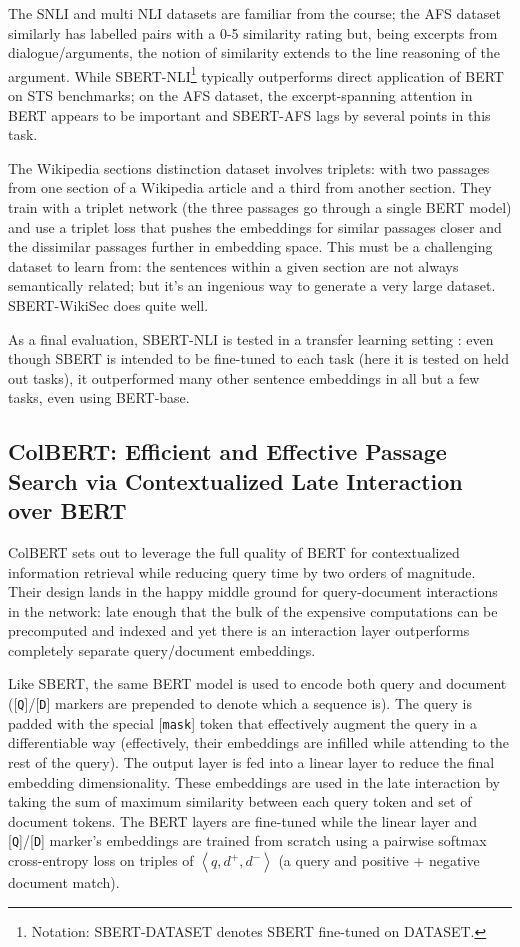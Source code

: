 \documentclass[11pt]{article}
\begin{document}
The SNLI and multi NLI datasets are familiar from the course; the AFS dataset similarly has labelled pairs with a 0-5 similarity rating but, being excerpts from dialogue/arguments, the notion of similarity extends to the line reasoning of the argument. While SBERT-NLI\footnote[1]{Notation: SBERT-DATASET denotes SBERT fine-tuned on DATASET.} typically outperforms direct application of BERT on STS benchmarks; on the AFS dataset, the excerpt-spanning attention in BERT appears to be important and SBERT-AFS lags by several points in this task. 

The Wikipedia sections distinction dataset involves triplets: with two passages from one section of a Wikipedia article and a third from another section. They train with a triplet network (the three passages go through a single BERT model) and use a triplet loss that pushes the embeddings for similar passages closer and the dissimilar passages further in embedding space. This must be a challenging dataset to learn from: the sentences within a given section are not always semantically related; but it's an ingenious way to generate a very large dataset. SBERT-WikiSec does quite well.

As a final evaluation, SBERT-NLI is tested in a transfer learning setting \cite{Conneau2018}: even though SBERT is intended to be fine-tuned to each task (here it is tested on held out tasks), it outperformed many other sentence embeddings in all but a few tasks, even using BERT-base. 

\subsection{ColBERT: Efficient and Effective Passage Search via Contextualized Late Interaction over BERT \cite{ColBERT}}

ColBERT sets out to leverage the full quality of BERT for contextualized information retrieval while reducing query time by two orders of magnitude. Their design lands in the happy middle ground for query-document interactions in the network: late enough that the bulk of the expensive computations can be precomputed and indexed and yet there is an interaction layer outperforms completely separate query/document embeddings. 

Like SBERT, the same BERT model is used to encode both query and document ([\texttt{Q}]/[\texttt{D}] markers are prepended to denote which a sequence is). The query is padded with the special [\texttt{mask}] token that effectively augment the query in a differentiable way (effectively, their embeddings are infilled while attending to the rest of the query). The output layer is fed into a linear layer to reduce the final embedding dimensionality. These embeddings are used in the late interaction by taking the sum of maximum similarity between each query token and set of document tokens. The BERT layers are fine-tuned while the linear layer and [\texttt{Q}]/[\texttt{D}] marker's embeddings are trained from scratch using a pairwise softmax cross-entropy loss on triples of $\left< q, d^+, d^-\right>$ (a query and positive + negative document match). 
\end{document}
